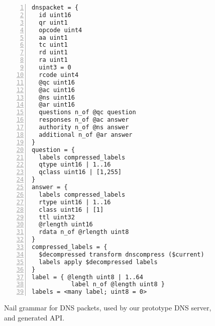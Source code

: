 \begin{figure}
\smaller[0.5]
\begin{Verbatim}[numbers=left]
dnspacket = {
  id uint16
  qr uint1
  opcode uint4
  aa uint1
  tc uint1
  rd uint1
  ra uint1
  uint3 = 0
  rcode uint4
  @qc uint16
  @ac uint16
  @ns uint16
  @ar uint16
  questions n_of @qc question
  responses n_of @ac answer
  authority n_of @ns answer
  additional n_of @ar answer
}
question = {
  labels compressed_labels
  qtype uint16 | 1..16
  qclass uint16 | [1,255]
}
answer = {
  labels compressed_labels
  rtype uint16 | 1..16
  class uint16 | [1]
  ttl uint32
  @rlength uint16
  rdata n_of @rlength uint8
}
compressed_labels = {
  $decompressed transform dnscompress ($current)
  labels apply $decompressed labels
}
label = { @length uint8 | 1..64
           label n_of @length uint8 }
labels = <many label; uint8 = 0>
\end{Verbatim}

\caption{Nail grammar for DNS packets, used by our prototype DNS server, and generated API.}
\label{fig:dns-full}
\end{figure}
